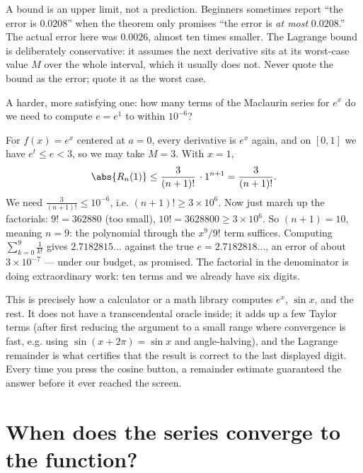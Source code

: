 \begin{trapbox}
A bound is an upper limit, not a prediction. Beginners sometimes report ``the error
is $0.0208$'' when the theorem only promises ``the error is \emph{at most}
$0.0208$.'' The actual error here was $0.0026$, almost ten times smaller. The
Lagrange bound is deliberately conservative: it assumes the next derivative sits at
its worst-case value $M$ over the whole interval, which it usually does not. Never
quote the bound as the error; quote it as the worst case.
\end{trapbox}

\begin{labbox}
A harder, more satisfying one: how many terms of the Maclaurin series for $e^x$ do
we need to compute $e = e^1$ to within $10^{-6}$?

For $f(x) = e^x$ centered at $a=0$, every derivative is $e^x$ again, and on
$[0,1]$ we have $e^t \le e < 3$, so we may take $M = 3$. With $x=1$,
\[
  \abs{R_n(1)} \le \frac{3}{(n+1)!}\,\cdot 1^{n+1} = \frac{3}{(n+1)!}.
\]
We need $\frac{3}{(n+1)!} \le 10^{-6}$, i.e. $(n+1)! \ge 3\times 10^{6}$. Now just
march up the factorials: $9! = 362880$ (too small), $10! = 3628800 \ge 3\times10^6$.
So $(n+1) = 10$, meaning $n = 9$: the polynomial through the $x^9/9!$ term suffices.
Computing $\sum_{k=0}^{9} \frac{1}{k!}$ gives $2.7182815\ldots$ against the true
$e = 2.7182818\ldots$, an error of about $3\times 10^{-7}$ --- under our budget, as
promised. The factorial in the denominator is doing extraordinary work: ten terms and
we already have six digits.
\end{labbox}

\begin{applicationbox}
This is precisely how a calculator or a math library computes $e^x$, $\sin x$, and
the rest. It does not have a transcendental oracle inside; it adds up a few Taylor
terms (after first reducing the argument to a small range where convergence is fast,
e.g. using $\sin(x + 2\pi) = \sin x$ and angle-halving), and the Lagrange remainder
is what certifies that the result is correct to the last displayed digit. Every time
you press the cosine button, a remainder estimate guaranteed the answer before it ever
reached the screen.
\end{applicationbox}

\section{When does the series converge to the function?}

